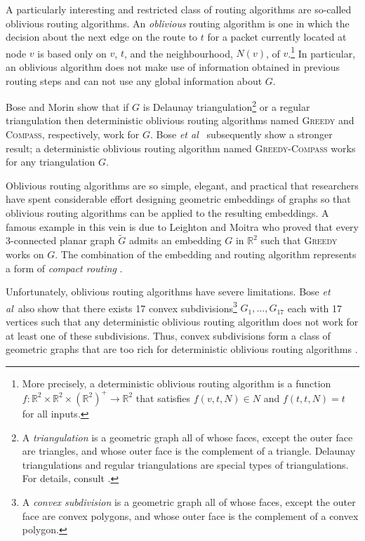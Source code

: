 \documentclass [letterpaper] {patmorin}
\newcommand{\R}{\mathbb{R}}
\newcommand{\etal}{\emph{et al}}
\begin{document}
A particularly interesting and restricted class of routing algorithms are so-called oblivious routing algorithms.  An \emph{oblivious} routing algorithm is one in which the decision about the next edge on the route to $t$ for a packet currently located at node $v$ is based only on $v$, $t$, and the neighbourhood, $N(v)$, of $v$.\footnote{More precisely, a deterministic oblivious routing algorithm is a function $f:\R^2\times\R^2\times(\R^2)^+\rightarrow \R^2$ that satisfies $f(v,t,N) \in N$ and $f(t,t,N) = t$ for all inputs.}  In particular, an oblivious algorithm does not make use of information obtained in previous routing steps and can not use any global information about $G$.

Bose and Morin \cite{bose04} show that if $G$ is Delaunay triangulation\footnote{A \emph{triangulation} is a geometric graph all of whose faces, except the outer face are triangles, and whose outer face is the complement of a triangle. Delaunay triangulations and regular triangulations are special types of triangulations. For details, consult \cite{obs92}.} or a regular triangulation then deterministic oblivious routing algorithms named \textsc{Greedy} and \textsc{Compass}, respectively, work for $G$. Bose \etal\ \cite{bose02} subsequently show a stronger result; a deterministic oblivious routing algorithm named \textsc{Greedy-Compass} works for any triangulation $G$.

Oblivious routing algorithms are so simple, elegant, and practical that researchers have spent considerable effort designing geometric embeddings of graphs so that oblivious routing algorithms can be applied to the resulting embeddings.  A famous example in this vein is due to Leighton and Moitra \cite{lm08} who proved that every 3-connected planar graph $\tilde G$ admits an embedding $G$ in $\R^2$ such that \textsc{Greedy} works on $G$.  The combination of the embedding and routing algorithm represents a form of \emph{compact routing} \cite{l94}.

Unfortunately, oblivious routing algorithms have severe limitations.  Bose \etal\ also show that there exists 17 convex subdivisions\footnote{A \emph{convex subdivision} is a geometric graph all of whose faces, except the outer face are convex polygons, and whose outer face is the complement of a convex polygon.} $G_1,\ldots,G_{17}$ each with 17 vertices such that any deterministic oblivious routing algorithm does not work for at least one of these subdivisions.  Thus, convex subdivisions form a class of geometric graphs that are too rich for deterministic oblivious routing algorithms \cite{bose02}.  
\end{document}
